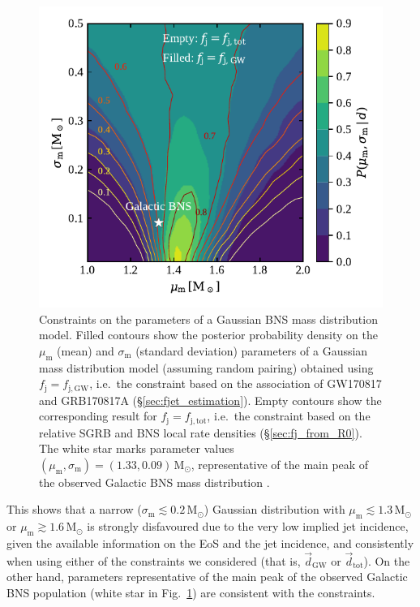 \documentclass[]{aa}
\newcommand{\resp}[1]{#1}
\begin{document}
\begin{figure} 
 \centering
 \includegraphics[width=\columnwidth]{figures/Pm_mu_sigma.pdf}
 \caption{Constraints on the parameters of a Gaussian BNS mass distribution model. Filled contours show the posterior probability density on the $\mu_\mathrm{m}$ (mean) and $\sigma_\mathrm{m}$ (standard deviation) parameters of a Gaussian mass distribution model (assuming random pairing) obtained using $f_\mathrm{j}=f_\mathrm{j,GW}$, i.e.~the constraint based on the association of GW170817 and GRB170817A (\S\ref{sec:fjet_estimation}). Empty contours show the corresponding result for $f_\mathrm{j}=f_\mathrm{j,tot}$, i.e.~the constraint based on the relative SGRB and BNS local rate densities (\S\ref{sec:fj_from_R0}). The white star marks parameter values $(\mu_\mathrm{m},\sigma_\mathrm{m})=(1.33,0.09)\,\mathrm{M_\odot}$, representative of the main peak of the observed Galactic BNS mass distribution \citep{Ozel2016}.}  
 \label{fig:Pm_mu_sigma}
\end{figure}
%
This shows that a narrow ($\sigma_\mathrm{m}\lesssim 0.2\,\mathrm{M_\odot}$) Gaussian distribution with $\mu_\mathrm{m}\lesssim 1.3\,\mathrm{M_\odot}$ or $\mu_\mathrm{m}\gtrsim 1.6\,\mathrm{M_\odot}$ is strongly disfavoured due to the very low implied jet \resp{incidence}, \resp{given the available information on} the EoS \resp{and the jet incidence}, and consistently when using either of the constraints we considered (\resp{that is}, $\vec d_\mathrm{GW}$ or $\vec d_\mathrm{tot}$). On the other hand, parameters representative of the main peak of the observed Galactic BNS population (white star in Fig.~\ref{fig:Pm_mu_sigma}) are \resp{consistent with the constraints}. 
\end{document}
